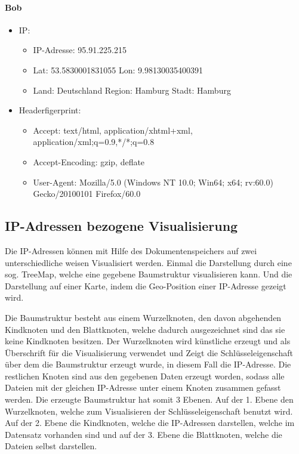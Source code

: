 \documentclass[
    fontsize=12pt,
    headings=small,
    parskip=half,           %
    bibliography=totoc,
    numbers=noenddot,       %
    open=any,               %
    ]{scrreprt}
\begin{document}
\paragraph{Bob}
\begin{itemize}
  \item IP: 
  \begin{itemize}
  \item IP-Adresse: 95.91.225.215
  \item Lat: 53.5830001831055 Lon: 9.98130035400391
  \item Land: Deutschland Region: Hamburg Stadt: Hamburg
  \end{itemize}
  \item Headerfigerprint:  
  \begin{itemize}
  \item Accept: text/html, application/xhtml+xml, application/xml;q=0.9,*/*;q=0.8
  \item Accept-Encoding: gzip, deflate
  \item User-Agent: Mozilla/5.0 (Windows NT 10.0; Win64; x64; rv:60.0) Gecko/20100101 Firefox/60.0
  \end{itemize}
\end{itemize}

    \subsection{IP-Adressen bezogene Visualisierung} \label{ipVis}
Die IP-Adressen können mit Hilfe des Dokumentenspeichers auf zwei unterschiedliche weisen Visualisiert werden. 
Einmal die Darstellung durch eine sog. TreeMap, welche eine gegebene Baumstruktur visualisieren kann. 
Und die Darstellung auf einer Karte, indem die Geo-Position einer IP-Adresse gezeigt wird.

Die Baumstruktur besteht aus einem Wurzelknoten, den davon abgehenden Kindknoten und den Blattknoten, welche dadurch ausgezeichnet sind das sie keine Kindknoten besitzen. 
Der Wurzelknoten wird künstliche erzeugt und als Überschrift für die Visualisierung verwendet und Zeigt die Schlüsseleigenschaft über dem die Baumstruktur erzeugt wurde, in diesem Fall die IP-Adresse.
Die restlichen Knoten sind aus den gegebenen Daten erzeugt worden, sodass alle Dateien mit der gleichen IP-Adresse unter einem Knoten zusammen gefasst werden.
Die erzeugte Baumstruktur hat somit 3 Ebenen. 
Auf der 1. Ebene den Wurzelknoten, welche zum Visualisieren der Schlüsseleigenschaft benutzt wird. 
Auf der 2. Ebene die Kindknoten, welche die IP-Adressen darstellen, welche im Datensatz vorhanden sind und auf der 3. Ebene die Blattknoten, welche die Dateien selbst darstellen.
\end{document}
